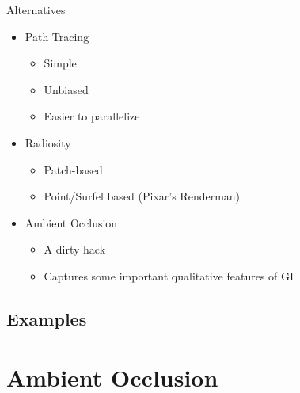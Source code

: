 \documentclass{beamer}
\begin{document}
    \begin{frame}{Alternatives}
      \begin{itemize}
        \item<2-> Path Tracing
          \begin{itemize}
            \item<3-> Simple
            \item<4-> Unbiased
            \item<4-> Easier to parallelize
          \end{itemize}
        \item<5-> Radiosity
          \begin{itemize}
            \item<6-> Patch-based
            \item<7-> Point/Surfel based (Pixar's Renderman)
          \end{itemize}
        \item<5-> Ambient Occlusion
          \begin{itemize}
            \item<6-> A dirty hack
            \item<7-> Captures some important qualitative features of GI
          \end{itemize}
      \end{itemize}
    \end{frame}

    \subsection{Examples}

  \section{Ambient Occlusion}
\end{document}
